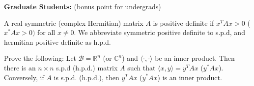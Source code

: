 \documentclass{ximera}
\begin{document}
\textbf{Graduate Students:} (bonus point for undergrads)

\begin{definition}
    A real symmetric (complex Hermitian) matrix $A$ is positive definite if $x^TAx > 0$ ($x^*Ax > 0)$ for all $x\neq 0$.  We abbreviate symmetric positive definite to s.p.d, and hermitian positive definite as h.p.d.
\end{definition}

\begin{exercise}
    Prove the following: Let $\mathcal{B} = \mathbb{R}^n$ (or $\mathbb{C}^n$) and $\langle \cdot, \cdot \rangle$ be an inner product.  Then there is an $n \times n$ s.p.d (h.p.d.) matrix $A$ such that $\langle x, y \rangle = y^TAx$ ($y^*Ax$).  Conversely, if $A$ is s.p.d. (h.p.d.), then $y^TAx$ ($y^*Ax$) is an inner product.
\end{exercise}
\end{document}
